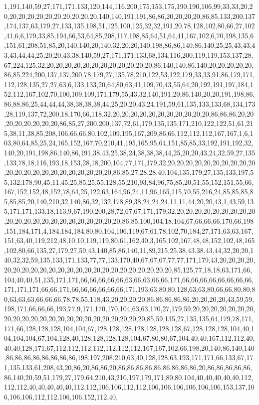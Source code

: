 1,191,140,59,27,171,171,133,120,144,116,200,175,153,175,190,190,106,99,33,33,20,20,20,20,20,20,20,20,20,20,20,20,140,140,191,191,86,86,20,20,20,20,86,85,133,200,137,174,137,63,179,27,133,135,198,51,125,100,125,32,32,191,20,78,128,102,80,66,27,102,41,6,6,179,33,85,194,66,53,64,85,208,117,198,85,64,51,64,41,167,102,6,70,198,135,6,151,61,208,51,85,20,140,140,20,140,32,20,20,140,198,86,86,140,86,140,25,25,43,43,43,43,44,44,25,20,20,43,38,140,59,27,171,171,133,68,134,116,200,119,119,153,137,28,67,224,125,32,20,20,20,20,20,20,20,20,20,20,20,20,86,140,140,86,140,20,20,20,20,20,86,85,224,200,137,137,200,78,179,27,135,78,210,122,53,122,179,33,33,91,86,179,171,112,128,135,27,27,63,6,133,133,20,64,80,63,41,109,70,43,55,64,20,192,191,197,184,152,112,167,102,70,100,109,109,171,179,55,43,32,140,191,20,86,140,20,20,191,198,86,86,88,86,25,44,44,44,38,38,38,38,44,25,20,20,43,24,191,59,61,135,133,133,68,134,173,28,119,137,72,200,18,170,66,118,32,20,20,20,20,20,20,20,20,20,20,20,86,86,86,20,20,20,20,20,20,20,20,86,85,27,200,200,137,72,61,179,135,135,171,210,122,122,51,61,215,38,11,38,85,208,106,66,66,80,102,109,195,167,209,86,66,112,112,112,167,167,1,6,103,80,64,85,25,24,165,152,167,70,210,41,195,165,95,64,151,85,85,33,192,191,192,32,140,20,191,198,86,140,86,191,38,43,25,38,24,38,38,38,44,25,20,20,43,24,32,59,27,135,133,78,18,116,193,18,153,28,18,200,104,77,171,179,32,20,20,20,20,20,20,20,20,20,20,20,20,20,20,20,20,20,20,20,20,20,20,86,85,27,28,28,40,104,135,179,27,135,133,197,55,132,178,90,45,11,45,25,85,25,55,128,55,210,93,84,96,75,85,20,51,55,152,151,55,66,167,152,152,48,152,78,64,25,122,63,164,96,24,11,96,165,115,70,55,216,24,85,85,85,85,85,85,20,140,210,32,140,86,32,132,178,89,38,24,24,24,11,11,44,20,20,43,1,43,59,135,171,171,133,18,113,9,67,190,200,28,72,67,67,171,179,32,20,20,20,20,20,20,20,20,20,20,20,20,20,20,20,20,20,20,20,20,20,20,86,85,100,104,18,104,67,66,66,66,170,66,198,151,184,171,4,184,184,184,80,80,104,106,119,67,61,78,102,70,184,27,171,63,63,167,151,63,40,119,212,48,10,10,119,119,80,61,162,40,3,165,102,167,48,48,152,102,48,165,102,80,66,135,27,179,27,59,43,140,85,86,140,11,89,215,25,38,43,38,43,44,32,20,20,140,32,32,59,135,133,171,133,77,77,133,170,40,67,67,67,77,77,171,179,43,20,20,20,20,20,20,20,20,20,20,20,20,20,20,20,20,20,20,20,20,20,20,20,85,125,77,18,18,63,171,66,104,40,40,51,135,171,171,66,66,66,66,66,63,66,63,66,66,171,66,66,66,66,66,66,66,66,171,171,171,66,66,171,66,66,66,66,66,66,171,193,63,80,80,128,63,63,80,66,66,80,80,80,63,63,63,66,66,66,78,78,55,118,43,20,20,20,20,86,86,86,86,86,20,20,20,20,43,59,59,198,171,66,66,66,193,77,9,171,170,170,104,63,63,170,27,179,59,20,20,20,20,20,20,20,20,20,20,20,20,20,20,20,20,20,20,20,20,20,20,20,85,59,135,27,135,135,64,179,78,171,171,66,128,128,128,104,104,67,128,128,128,128,128,128,128,67,128,128,128,104,40,104,104,104,67,104,128,40,128,128,128,128,104,67,80,80,67,104,40,40,167,112,112,40,40,40,128,171,67,112,112,112,112,112,112,112,167,167,102,66,198,20,140,86,140,140,86,86,86,86,86,86,86,86,198,197,208,210,63,40,128,128,63,193,171,171,66,133,67,171,135,133,61,208,43,20,86,20,86,86,20,86,86,86,86,86,86,86,86,86,20,86,86,86,86,86,86,140,20,59,51,179,27,179,64,210,43,210,197,179,171,80,80,104,40,40,40,40,40,112,112,112,40,40,40,40,40,112,112,106,106,112,112,106,106,106,106,106,106,153,137,106,106,106,112,112,106,106,152,112,40,